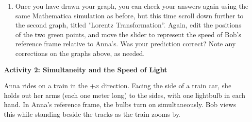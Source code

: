 \begin{enumerate}
\item Once you have drawn your graph, you can check your answers again using the same Mathematica simulation as before, but this time scroll down further to the second graph, titled "Lorentz Transformation''.  Again, edit the positions of the two green points, and move the slider to represent the speed of Bob's reference frame relative to Anna's.  Was your prediction correct?  Note any corrections on the graphs above, as needed. 
\end{enumerate}

\textbf{Activity 2: Simultaneity and the Speed of Light}

Anna rides on a train in the $+x$ direction.  Facing the side of a train car, she holds out her arms (each one meter long) to the sides, with one lightbulb in each hand.  In Anna's reference frame, the bulbs turn on simultaneously.  Bob views this while standing beside the tracks as the train zooms by.

